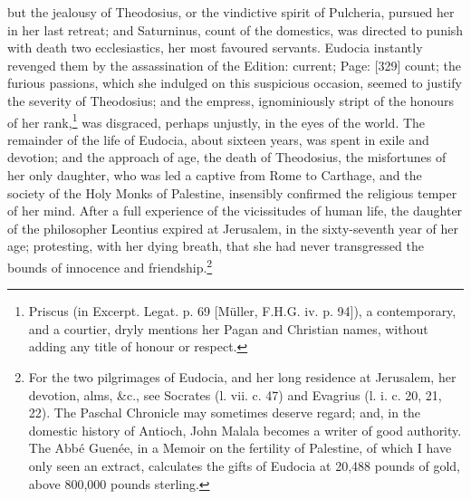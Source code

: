 but the jealousy of Theodosius, or the vindictive spirit of Pulcheria, pursued her in her last retreat; and Saturninus, count of the domestics, was directed to punish with death two ecclesiastics, her most favoured servants. Eudocia instantly revenged them by the assassination of the Edition: current; Page: [329] count; the furious passions, which she indulged on this suspicious occasion, seemed to justify the severity of Theodosius; and the empress, ignominiously stript of the honours of her rank,\footnote{Priscus (in Excerpt. Legat. p. 69 [Müller, F.H.G. iv. p. 94]), a contemporary, and a courtier, dryly mentions her Pagan and Christian names, without adding any title of honour or respect.} was disgraced, perhaps unjustly, in the eyes of the world. The remainder of the life of Eudocia, about sixteen years, was spent in exile and devotion; and the approach of age, the death of Theodosius, the misfortunes of her only daughter, who was led a captive from Rome to Carthage, and the society of the Holy Monks of Palestine, insensibly confirmed the religious temper of her mind. After a full experience of the vicissitudes of human life, the daughter of the philosopher Leontius expired at Jerusalem, in the sixty-seventh year of her age; protesting, with her dying breath, that she had never transgressed the bounds of innocence and friendship.\footnote{For the two pilgrimages of Eudocia, and her long residence at Jerusalem, her devotion, alms, \&c., see Socrates (l. vii. c. 47) and Evagrius (l. i. c. 20, 21, 22). The Paschal Chronicle may sometimes deserve regard; and, in the domestic history of Antioch, John Malala becomes a writer of good authority. The Abbé Guenée, in a Memoir on the fertility of Palestine, of which I have only seen an extract, calculates the gifts of Eudocia at 20,488 pounds of gold, above 800,000 pounds sterling.}


